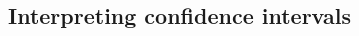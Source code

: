 \begin{spacing}{1.5}

\subsection{Interpreting confidence intervals}
\label{interpretingCIs}



\end{spacing}
